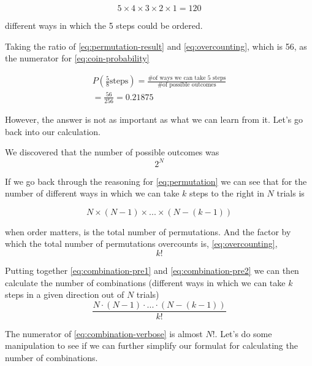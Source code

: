 \begin{equation}
5 \times 4 \times 3 \times 2 \times 1 = 120 \label{eq:overcounting}
\end{equation}

different ways in which the 5 steps could be ordered.

Taking the ratio of \eqref{eq:permutation-result} and \eqref{eq:overcounting}, which is 56, as the numerator for \eqref{eq:coin-probability}

\begin{align}
P \left( \frac{5}{8} \mbox{steps} \right) 
= \frac{\mbox{\# of ways we can take 5 steps}}{\mbox{\# of possible outcomes}} \\
= \frac{56}{256} = 0.21875
\end{align}

However, the answer is not as important as what we can learn from it.
Let's go back into our calculation.

We discovered that the number of possible outcomes was
\begin{equation}
2^N
\end{equation}

If we go back through the reasoning for \eqref{eq:permutation} we can see that for the number of different ways in which we can take $k$ steps to the right in $N$ trials is

\begin{equation}
N \times 
\left( N-1 \right) \times
... \times
\left( N- (k-1) \right) \label{eq:combination-pre1}
\end{equation}

when order matters, is the total number of permutations.
And the factor by which the total number of permutations overcounts is, \eqref{eq:overcounting},
\begin{equation}
k! \label{eq:combination-pre2}
\end{equation}

Putting together \eqref{eq:combination-pre1} and \eqref{eq:combination-pre2} we can then calculate the number of combinations (different ways in which we can take $k$ steps in a given direction out of $N$ trials)
\begin{equation}
\frac{N \cdot (N-1) \cdot ... \cdot (N - (k-1))}{k!} \label{eq:combination-verbose}
\end{equation}

The numerator of \eqref{eq:combination-verbose} is almost $N!$.
Let's do some manipulation to see if we can further simplify our formulat for calculating the number of combinations.

